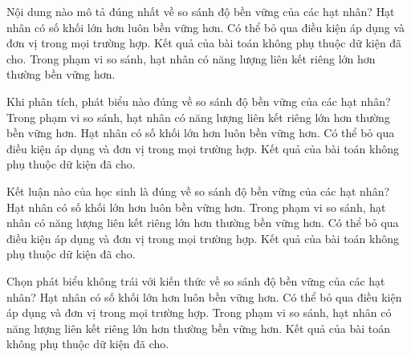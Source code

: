 \begin{ex}
Nội dung nào mô tả đúng nhất về so sánh độ bền vững của các hạt nhân?
\choice
{Hạt nhân có số khối lớn hơn luôn bền vững hơn.}
{Có thể bỏ qua điều kiện áp dụng và đơn vị trong mọi trường hợp.}
{Kết quả của bài toán không phụ thuộc dữ kiện đã cho.}
{\True Trong phạm vi so sánh, hạt nhân có năng lượng liên kết riêng lớn hơn thường bền vững hơn.}
\end{ex}

\begin{ex}
Khi phân tích, phát biểu nào đúng về so sánh độ bền vững của các hạt nhân?
\choice
{\True Trong phạm vi so sánh, hạt nhân có năng lượng liên kết riêng lớn hơn thường bền vững hơn.}
{Hạt nhân có số khối lớn hơn luôn bền vững hơn.}
{Có thể bỏ qua điều kiện áp dụng và đơn vị trong mọi trường hợp.}
{Kết quả của bài toán không phụ thuộc dữ kiện đã cho.}
\end{ex}

\begin{ex}
Kết luận nào của học sinh là đúng về so sánh độ bền vững của các hạt nhân?
\choice
{Hạt nhân có số khối lớn hơn luôn bền vững hơn.}
{\True Trong phạm vi so sánh, hạt nhân có năng lượng liên kết riêng lớn hơn thường bền vững hơn.}
{Có thể bỏ qua điều kiện áp dụng và đơn vị trong mọi trường hợp.}
{Kết quả của bài toán không phụ thuộc dữ kiện đã cho.}
\end{ex}

\begin{ex}
Chọn phát biểu không trái với kiến thức về so sánh độ bền vững của các hạt nhân?
\choice
{Hạt nhân có số khối lớn hơn luôn bền vững hơn.}
{Có thể bỏ qua điều kiện áp dụng và đơn vị trong mọi trường hợp.}
{\True Trong phạm vi so sánh, hạt nhân có năng lượng liên kết riêng lớn hơn thường bền vững hơn.}
{Kết quả của bài toán không phụ thuộc dữ kiện đã cho.}
\end{ex}

